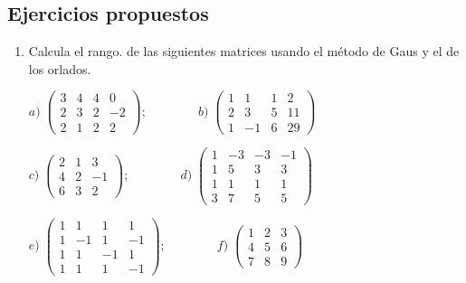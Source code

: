 \subsection{Ejercicios propuestos}

\begin{enumerate}

\item Calcula el rango. de las siguientes matrices usando el método de Gaus y el de los orlados.

$a)\; \left( \begin{matrix} 3&4&4&0\\2&3&2&-2\\2&1&2&2 \end{matrix} \right) ; \qquad \qquad
b)\;  \left( \begin{matrix} 1&1&1&2\\2&3&5&11\\1&-1&6&29  \end{matrix} \right)$

$c)\; \left( \begin{matrix} 2&1&3\\4&2&-1\\6&3&2   \end{matrix} \right) ; \qquad  \qquad 
d)\;  \left( \begin{matrix} 1&-3&-3&-1\\1&5&3&3\\1&1&1&1\\ 3&7&5&5 \end{matrix} \right)$

$e)\; \left( \begin{matrix} 1&1&1&1\\1&-1&1&-1\\1&1&-1&1\\1&1&1&-1 \end{matrix} \right) ; \qquad   \qquad
f)\;  \left( \begin{matrix} 1&2&3\\4&5&6\\7&8&9 \end{matrix} \right)$





\vspace{2mm}



\end{enumerate}
